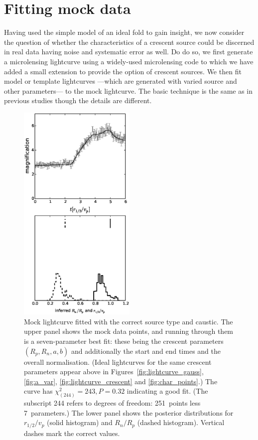 \documentclass[usenatbib]{mn2e}
\begin{document}
\section{Fitting mock data}\label{sec:numerics}

Having used the simple model of an ideal fold to gain insight, we now
consider the question of whether the characteristics of a crescent
source could be discerned in real data having noise and systematic
error as well.  Do do so, we first generate a microlensing lightcurve
using a widely-used microlensing code
\citep{1990PhDT.......180W,1999A&A...346L...5W,1999JCoAM.109..353W} to
which we have added a small extension to provide the option of
crescent sources.  We then fit model or template lightcurves ---which
are generated with varied source and other parameters--- to the mock
lightcurve.  The basic technique is the same as in previous studies
\citep[e.g.,][]{2010ApJ...712..658P} though the details are different.

\begin{figure}
\centering
  \includegraphics[width=0.5\textwidth]{figures/cc_forward.eps}
\caption{\label{fig:cc_forward} Mock lightcurve fitted with the
  correct source type and caustic.  The upper panel shows the mock
  data points, and running through them is a seven-parameter best fit:
  these being the crescent parameters $(R_p,R_n,a,b)$ and additionally
  the start and end times and the overall normalisation.  (Ideal
  lightcurves for the same crescent parameters appear above in
  Figures~\ref{fig:lightcurve_gauss}, \ref{fig:a_var},
  \ref{fig:lightcurve_crescent} and \ref{fig:char_points}.)  The curve
  has $\chi^2_{(244)}=243, P=0.32$ indicating a good fit.  (The
  subscript 244 refers to degrees of freedom: 251~points less
  7~parameters.)  The lower panel shows the posterior distributions
  for $r_{1/2}/v_p$ (solid histogram) and $R_n/R_p$ (dashed histogram).
  Vertical dashes mark the correct values.}
\end{figure}
\end{document}
